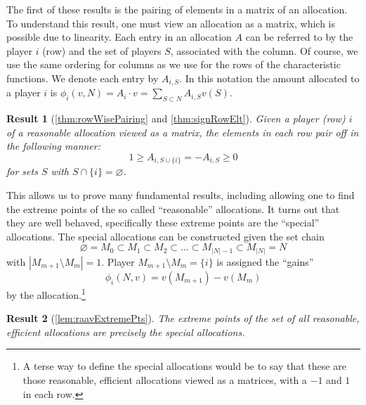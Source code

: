 \documentclass[12pt,letterpaper,final]{article}
\theoremstyle{plain}
\theoremstyle{plain}
\theoremstyle{plain}
\theoremstyle{plain}
\theoremstyle{plain}
\theoremstyle{plain}
\theoremstyle{plain}
\newtheorem{result}{Result}
\theoremstyle{definition}
\theoremstyle{definition}
\theoremstyle{definition}
\theoremstyle{definition}
\theoremstyle{definition}
\theoremstyle{remark}
\theoremstyle{remark}
\theoremstyle{remark}
\theoremstyle{remark}
\begin{document}
The first of these results is the pairing of elements in a matrix of an allocation. To
understand this result, one must view an allocation as a matrix, which
is possible due to linearity.  Each
entry in an allocation \(A\) can be referred to by the player \(i\)
(row) and the set of players \(S\), associated with the column. Of
course, we use the same ordering for columns as we use for the rows of
the characteristic functions. We
denote each entry by \(A_{i,S}\).  In this notation the amount allocated to a
player \(i\)  is
\(\phi_i(v,N) = A_i\cdot v = \sum_{S\subset N} A_{i,S}v(S)\).

\begin{result}[\cref{thm:rowWisePairing} and \cref{thm:signRowElt}]
  Given a player (row) \(i\) of a reasonable allocation viewed as a
  matrix, the elements in each row pair off in the following manner:
  \begin{equation*}
    1 \geq A_{i,S\cup\{i\}}=-A_{i,S} \geq 0
  \end{equation*}
  for sets \(S\) with \(S \cap \{i\} = \varnothing\).
\end{result}
This allows us to prove many fundamental results, including allowing
one to find the extreme points of the so called ``reasonable''
allocations. It turns out that they are well behaved, specifically
these extreme points are the ``special'' allocations.
The special allocations can be constructed given the set chain
\[
  \varnothing = M_0 \subset M_1 \subset M_2\subset \ldots \subset
  M_{|N|-1} \subset M_{|N|}=N
\]
with \(\left|M_{m+1}\setminus M_m\right| = 1\). Player
\(M_{m+1}\setminus M_m = \{i\}\) is assigned the ``gains''
\[
  \phi_{i}(N,v) = v(M_{m+1}) - v(M_m)
\]
by the allocation.\footnote{A terse way to define the special
  allocations would be to say that these are those reasonable,
  efficient allocations viewed as a matrices, with a \(-1\) and \(1\)
  in each row.}

\begin{result}[\cref{lem:raavExtremePts}]
  The extreme points of the set of all reasonable, efficient
  allocations are precisely the special allocations.
\end{result}
\end{document}

